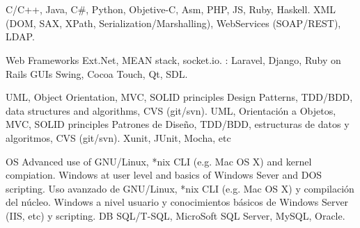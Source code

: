 \documentclass[11pt,a4paper,sans]{moderncv}
\begin{document}
\section{}


\cvcomputer
    {}
        {C/C++, Java, C\#, Python, Objetive-C, Asm, PHP, JS, Ruby, Haskell.}
    {}
        {XML (DOM, SAX, XPath, Serialization/Marshalling), WebServices
        (SOAP/REST), LDAP.}

\cvcomputer
    {Web Frameworks}
        {Ext.Net, MEAN stack, socket.io. : Laravel,
        Django, Ruby on Rails}
	{GUIs}
        {Swing, Cocoa Touch, Qt, SDL.}


\cvcomputer
    {}
        {\translate
            {UML, Object Orientation, MVC, SOLID principles Design Patterns,
            TDD/BDD, data structures and algorithms, CVS (git/svn).}
            {UML, Orientación a Objetos, MVC, SOLID principles Patrones de
            Diseño, TDD/BDD, estructuras de datos y algoritmos, CVS (git/svn).}
        }
    {}
        {Xunit, JUnit, Mocha, etc}



\cvcomputer
    {OS}
        {\translate
            {Advanced use of GNU/Linux, *nix CLI (e.g. Mac OS X) and kernel
            compiation. Windows at user level and basics of Windows Sever and
            DOS scripting.}
            {Uso avanzado de GNU/Linux, *nix CLI (e.g. Mac OS X) y compilación
            del núcleo. Windows a nivel usuario y conocimientos básicos de
            Windows Server (IIS, etc) y scripting.}
        }
    {DB}
        {SQL/T-SQL, MicroSoft SQL Server, MySQL, Oracle.}


\section{}

\end{document}
